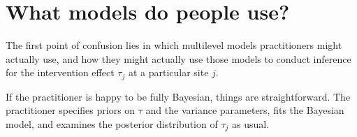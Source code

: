 \documentclass[]{article}
\begin{document}
%
%

\section{What models do people use?}

The first point of confusion lies in which multilevel models practitioners might actually use, and how they might actually use those models to conduct inference for the intervention effect $\tau_j$ at a particular site $j$.

If the practitioner is happy to be fully Bayesian, things are straightforward.
The practitioner specifies priors on $\tau$ and the variance parameters, fits the Bayesian model, and examines the posterior distribution of $\tau_j$ as usual.
\end{document}
